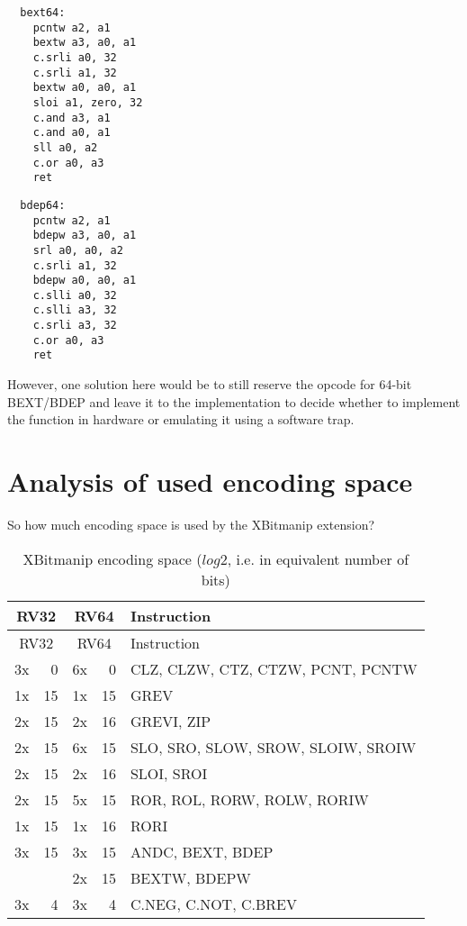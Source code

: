 \begin{multicols}{2}
\begin{minipage}{\linewidth}
\begin{verbatim}
  bext64:
    pcntw a2, a1
    bextw a3, a0, a1
    c.srli a0, 32
    c.srli a1, 32
    bextw a0, a0, a1
    sloi a1, zero, 32
    c.and a3, a1
    c.and a0, a1
    sll a0, a2
    c.or a0, a3
    ret
\end{verbatim}
\end{minipage}

\begin{minipage}{\linewidth}
\begin{verbatim}
  bdep64:
    pcntw a2, a1
    bdepw a3, a0, a1
    srl a0, a0, a2
    c.srli a1, 32
    bdepw a0, a0, a1
    c.slli a0, 32
    c.slli a3, 32
    c.srli a3, 32
    c.or a0, a3
    ret
\end{verbatim}
\end{minipage}
\end{multicols}

However, one solution here would be to still reserve the opcode for 64-bit
BEXT/BDEP and leave it to the implementation to decide whether to implement the
function in hardware or emulating it using a software trap.

\section{Analysis of used encoding space}

So how much encoding space is used by the XBitmanip extension?

\begin{longtable}[c]{@{}rr|rr|l@{}}
\caption{XBitmanip encoding space ($log2$, i.e. in equivalent number of bits)}\tabularnewline
\toprule
\multicolumn{2}{c}{RV32} & \multicolumn{2}{c}{RV64} & Instruction\tabularnewline
\midrule
\endfirsthead
\toprule
\multicolumn{2}{c}{RV32} & \multicolumn{2}{c}{RV64} & Instruction\tabularnewline
\midrule
\endhead
3x &  0 & 6x &  0 & CLZ, CLZW, CTZ, CTZW, PCNT, PCNTW\tabularnewline
\midrule
1x & 15 & 1x & 15 & GREV\tabularnewline
2x & 15 & 2x & 16 & GREVI, ZIP\tabularnewline
\midrule
2x & 15 & 6x & 15 & SLO, SRO, SLOW, SROW, SLOIW, SROIW\tabularnewline
2x & 15 & 2x & 16 & SLOI, SROI\tabularnewline
\midrule
2x & 15 & 5x & 15 & ROR, ROL, RORW, ROLW, RORIW\tabularnewline
1x & 15 & 1x & 16 & RORI\tabularnewline
\midrule
3x & 15 & 3x & 15 & ANDC, BEXT, BDEP\tabularnewline
   &    & 2x & 15 & BEXTW, BDEPW\tabularnewline
\midrule
3x &  4 & 3x &  4 & C.NEG, C.NOT, C.BREV\tabularnewline
\bottomrule
\end{longtable}

